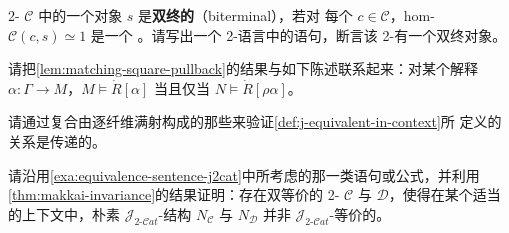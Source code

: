 \begin{exercise}\label{ex:biterminal-sentence}
2-\trCategory{} $\mathcal{C}$ 中的一个对象 $s$ 是\textbf{双终的}（biterminal），若对
每个 $c\in\mathcal{C}$，hom-\trCategory{} $\mathcal{C}(c,s)\simeq 1$ 是一个%
\trContractible{}\trGroupoid。请写出一个 2-\trCategory{}语言中的语句，断言该
2-\trCategory{}有一个双终对象。
\end{exercise}

\begin{exercise}\label{ex:matching-square-statement}
请把\cref{lem:matching-square-pullback}的结果与如下陈述联系起来：对某个解释
$\alpha\colon\Gamma\to M$，$M\models\dot{R}[\alpha]$ 当且仅当 $N\models\dot{R}[\rho\alpha]$。
\end{exercise}

\begin{exercise}\label{ex:j-equivalence-transitive}
请通过复合由逐纤维满射构成的那些\trSpan{}来验证\cref{def:j-equivalent-in-context}所
定义的关系是传递的。
\end{exercise}

\begin{exercise}\label{ex:naive-not-j-equivalent}
请沿用\cref{exa:equivalence-sentence-j2cat}中所考虑的那一类语句或公式，并利用%
\cref{thm:makkai-invariance}的结果证明：存在双等价的 2-\trCategory{} $\mathcal{C}$
与 $\mathcal{D}$，使得在某个适当的上下文中，朴素 $\mathcal{J}_{2\text{-}\mathcal{C}at}$-结构
$N_{\mathcal{C}}$ 与 $N_{\mathcal{D}}$ 并非 $\mathcal{J}_{2\text{-}\mathcal{C}at}$-等价的。
\end{exercise}









